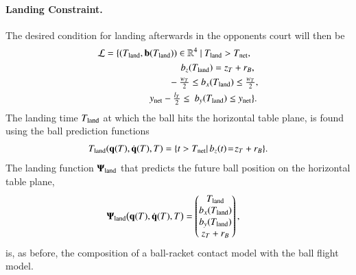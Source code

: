 \paragraph{\textbf{Landing Constraint}.} The desired condition for landing afterwards in the opponents court will then be 
%
\begin{equation}
\begin{aligned}
\mathcal{L} = \{(T_{\mathrm{land}}, \boldsymbol{\mathrm{b}}&(T_{\mathrm{land}})) \in \mathbb{R}^{4} \ | \ T_{\mathrm{land}} > T_{\mathrm{net}}, \\
& \qquad \quad \ b_z(T_{\mathrm{land}}) = z_{T} + r_{B}, \\
& \qquad -\tfrac{w_{T}}{2} \leq b_x(T_{\mathrm{land}}) \leq \tfrac{w_{T}}{2}, \\
&y_{\mathrm{net}} - \tfrac{l_{T}}{2}\leq \ b_y(T_{\mathrm{land}}) \leq y_{\mathrm{net}} \}. \label{landCond}
\end{aligned}
\end{equation}
%
The landing time $T_{\mathrm{land}}$ at which the ball hits the horizontal table plane, is found using the ball prediction functions
%
\begin{equation}
\begin{aligned}
T_{\mathrm{land}}(\boldsymbol{\mathrm{q}}(T),\dot{\boldsymbol{\mathrm{q}}}(T),T) = \{t > T_{\mathrm{net}} | \, b_z(t) \!=\! z_{T} + r_{B}\} \label{landTime}. 
\end{aligned}
\end{equation}
%
\noindent The landing function $\boldsymbol{\mathrm{\Psi}}_{\mathrm{land}}$ that predicts the future ball position on the horizontal table plane,
%
\begin{align}
&\boldsymbol{\mathrm{\Psi}}_{\mathrm{land}}\big(\boldsymbol{\mathrm{q}}(T),\dot{\boldsymbol{\mathrm{q}}}(T), T\big) = \begin{pmatrix}
T_{\mathrm{land}} \\ b_{x}(T_{\mathrm{land}}) \\ b_{y}(T_{\mathrm{land}}) \\ z_{T} + r_{B}
\end{pmatrix}, \label{switchCond3}
\end{align}
%
\noindent is, as before, the composition of a ball-racket contact model with the ball flight model.
%
